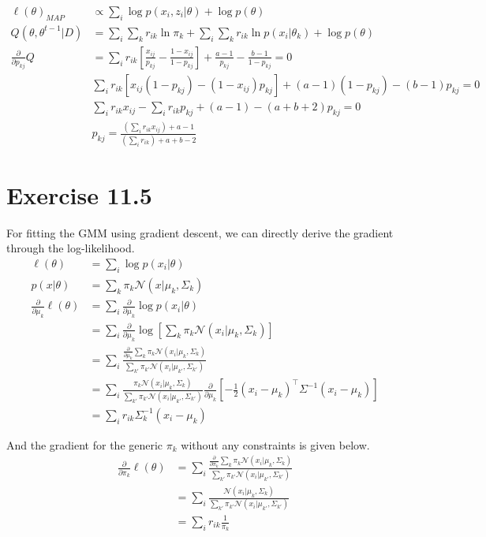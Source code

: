 \documentclass[11pt, letterpaper]{article}
\begin{document}
\begin{align*}
    \ell(\theta)_{MAP} &\propto \sum_i \log p(x_i, z_i|\theta) + \log p(\theta) \\
    Q(\theta, \theta^{t-1}|D) &= \sum_i \sum_k r_{ik} \ln \pi_k + \sum_i \sum_k r_{ik} \ln p(x_i|\theta_k) + \log p(\theta) \\
    \frac{\partial}{\partial p_{kj}}Q &= 
            \sum_i r_{ik} [\frac{x_{ij}}{p_{kj}} - \frac{1-x_{ij}}{1-p_{kj}}] + \frac{a-1}{p_{kj}} - \frac{b-1}{1-p_{kj}} = 0 \\
        & \sum_i r_{ik} [x_{ij}(1-p_{kj}) - (1-x_{ij})p_{kj}] + (a-1)(1-p_{kj}) - (b-1)p_{kj} = 0 \\
        & \sum_i r_{ik} x_{ij} - \sum_i r_{ik} p_{kj} + (a-1) - (a+b+2) p_{kj} = 0 \\
        & p_{kj} = \frac{(\sum_i r_{ik} x_{ij}) + a - 1}{(\sum_i r_{ik}) + a + b - 2}
\end{align*}


\section{Exercise 11.5}
For fitting the GMM using gradient descent, we can directly derive the gradient through the log-likelihood.
\begin{align*}
    \ell(\theta) &= \sum_i \log p(x_i|\theta) \\
    p(x|\theta) &= \sum_k \pi_k \mathcal{N}(x|\mu_k, \Sigma_k) \\
    \frac{\partial}{\partial \mu_k} \ell(\theta) &= \sum_i \frac{\partial}{\partial \mu_k} \log p(x_i|\theta) \\
        &= \sum_i \frac{\partial}{\partial \mu_k} \log [\sum_k \pi_k \mathcal{N}(x_i|\mu_k, \Sigma_k)] \\
        &= \sum_i \frac{\frac{\partial}{\partial \mu_k} \sum_{k} \pi_{k} \mathcal{N}(x_i|\mu_{k}, \Sigma_{k})}{\sum_{k'} \pi_{k'} \mathcal{N}(x_i|\mu_{k'}, \Sigma_{k'})} \\
        &= \sum_i
            \frac{ \pi_{k} \mathcal{N}(x_i|\mu_{k}, \Sigma_{k})}
                 {\sum_{k'} \pi_{k'} \mathcal{N}(x_i|\mu_{k'}, \Sigma_{k'})}
            \frac{\partial}{\partial \mu_k} [-\frac{1}{2}(x_i-\mu_k)^{\intercal}\Sigma^{-1}(x_i-\mu_k)] \\
        &= \sum_i r_{ik} \Sigma_{k}^{-1} (x_i - \mu_k)
\end{align*}

And the gradient for the generic $\pi_k$ without any constraints is given below.
\begin{align*}
    \frac{\partial}{\partial \pi_k} \ell(\theta) &= 
        \sum_i \frac{\frac{\partial}{\partial \pi_k} \sum_{k} \pi_{k} \mathcal{N}(x_i|\mu_{k}, \Sigma_{k})}
                    {\sum_{k'} \pi_{k'} \mathcal{N}(x_i|\mu_{k'}, \Sigma_{k'})} \\
        &= \sum_i \frac{\mathcal{N}(x_i|\mu_{k}, \Sigma_{k})}{\sum_{k'} \pi_{k'} \mathcal{N}(x_i|\mu_{k'}, \Sigma_{k'})} \\
        &= \sum_i r_{ik} \frac{1}{\pi_k}
\end{align*}
\end{document}
